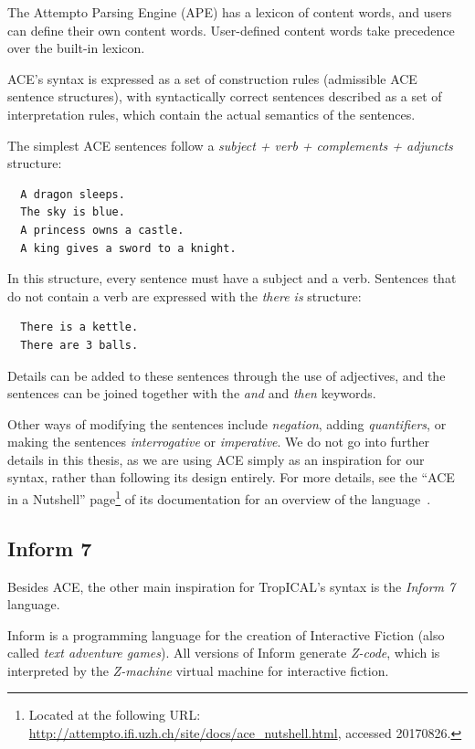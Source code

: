 \documentclass[11pt]{report}
\begin{document}
The Attempto Parsing Engine (APE) has a lexicon of content words, and users can
define their own content words. User-defined content words take precedence over
the built-in lexicon.

ACE's syntax is expressed as a set of construction rules (admissible ACE
sentence structures), with syntactically
correct sentences described as a set of interpretation rules, which contain the
actual semantics of the sentences.

The simplest ACE sentences follow a \emph{subject + verb + complements +
  adjuncts} structure:

\begin{lstlisting}
  A dragon sleeps.
  The sky is blue.
  A princess owns a castle.
  A king gives a sword to a knight.
\end{lstlisting}

In this structure, every sentence must have a subject and a verb. Sentences that
do not contain a verb are expressed with the \emph{there is} structure:

\begin{lstlisting}
  There is a kettle.
  There are 3 balls.
\end{lstlisting}

Details can be added to these sentences through the use of adjectives, and the
sentences can be joined together with the \emph{and} and \emph{then} keywords.

Other ways of modifying the sentences include \emph{negation}, adding
\emph{quantifiers}, or making the sentences \emph{interrogative} or
\emph{imperative}. We do not go into further details in this thesis, as we are
using ACE simply as an inspiration for our syntax, rather than following its
design entirely. For more details, see the ``ACE in a Nutshell''
page\footnote{Located at the following URL:
  \url{http://attempto.ifi.uzh.ch/site/docs/ace_nutshell.html}, accessed 20170826.} of its
documentation for an overview of the language~\citep{ace-nutshell}.

\subsection{Inform 7}
Besides ACE, the other main inspiration for TropICAL's syntax is the
\emph{Inform 7} language.

Inform is a programming language for the creation of Interactive Fiction (also
called \emph{text adventure games}). All versions of Inform generate
\emph{Z-code}, which is interpreted by the \emph{Z-machine} virtual machine for
interactive fiction.
\end{document}

